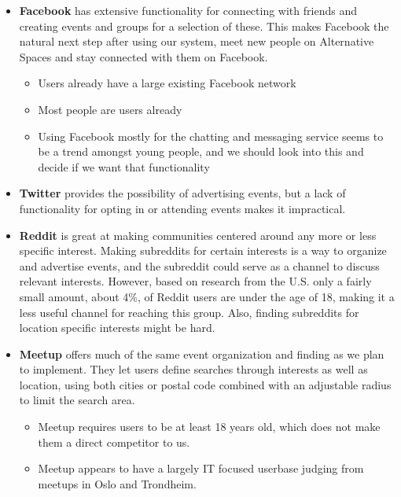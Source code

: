 \begin{itemize}
  \item \textbf{Facebook} has extensive functionality for connecting with friends and creating events and groups for a selection of these. This makes Facebook the natural next step after using our system, meet new people on Alternative Spaces and stay connected with them on Facebook. \begin{itemize}
    \item Users already have a large existing Facebook network
    \item Most people are users already
    \item Using Facebook mostly for the chatting and messaging service seems to be a trend amongst young people, and we should look into this and decide if we want that functionality
  \end{itemize}
  \item \textbf{Twitter} provides the possibility of advertising events, but a lack of functionality for opting in or attending events makes it impractical.
  \item \textbf{Reddit}  is great at making communities centered around any more or less specific interest. Making subreddits for certain interests is a way to organize and advertise events, and the subreddit could serve as a channel to discuss relevant interests. However, based on research from the U.S. only a fairly small amount, about 4\%, of Reddit users are under the age of 18, making it a less useful channel for reaching this group. Also, finding subreddits for location specific interests might be hard.
  \item \textbf{Meetup} offers much of the same event organization and finding as we plan to implement. They let users define searches through interests as well as location, using both cities or postal code combined with an adjustable radius to limit the search area. \begin{itemize}
    \item Meetup requires users to be at least 18 years old, which does not make them a direct competitor to us.
    \item Meetup appears to have a largely IT focused userbase judging from meetups in Oslo and Trondheim.
  \end{itemize}
\end{itemize}


